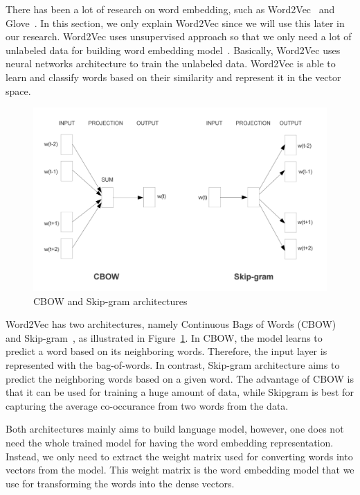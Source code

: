 There has been a lot of research on word embedding, such as Word2Vec~\citep{mikolov2014word2vec} and Glove~\citep{pennington2014glove}. In this section, we only explain Word2Vec since we will use this later in our research. Word2Vec uses unsupervised approach so that we only need a lot of unlabeled data for building word embedding model~\citep{mikolov2013efficient}. Basically, Word2Vec uses neural networks architecture to train the unlabeled data. Word2Vec is able to learn and classify words based on their similarity and represent it in the vector space.

\begin{figure}
	\centering
	\includegraphics[width=0.85\linewidth]{images/word2vec}
	\caption{CBOW and Skip-gram architectures~\citep{mikolov2013efficient}}
	\label{fig:word2vec}
\end{figure}

Word2Vec has two architectures, namely Continuous Bags of Words (CBOW) and Skip-gram~\citep{mikolov2013efficient}, as illustrated in Figure~\ref{fig:word2vec}. In CBOW, the model learns to predict a word based on its neighboring words. Therefore, the input layer is represented with the bag-of-words. In contrast, Skip-gram architecture aims to predict the neighboring words based on a given word. The advantage of CBOW is that it can be used for training a huge amount of data, while Skipgram is best for capturing the average co-occurance from two words from the data.

Both architectures mainly aims to build language model, however, one does not need the whole trained model for having the word embedding representation. Instead, we only need to extract the weight matrix used for converting words into vectors from the model. This weight matrix is the word embedding model that we use for transforming the words into the dense vectors.

